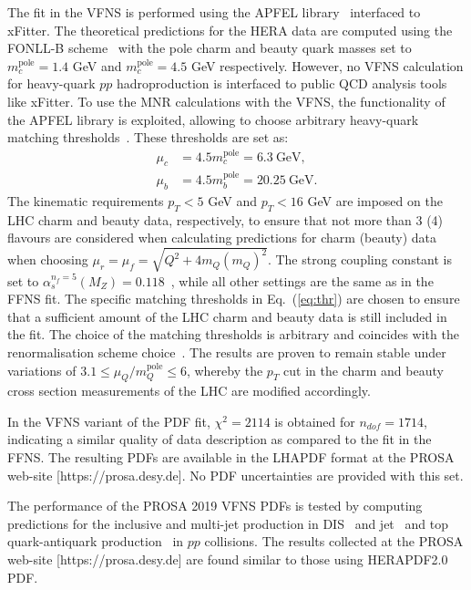 \documentclass[12pt]{article}
\begin{document}
The fit in the VFNS is performed using the APFEL library~\cite{Bertone:2013vaa} interfaced to xFitter.
The theoretical predictions for the HERA data are computed using the FONLL-B scheme~\cite{Forte:2010ta} with the pole charm and beauty quark masses set to $m_c^{\textrm{pole}} = 1.4$ GeV and $m_c^{\textrm{pole}} = 4.5$ GeV respectively.
However, no VFNS calculation for heavy-quark $pp$ hadroproduction is interfaced to public QCD analysis tools like xFitter.
To use the MNR calculations with the VFNS, the functionality of the APFEL library is exploited, allowing to choose arbitrary heavy-quark matching thresholds~\cite{Bertone:2017ehk}. These thresholds are set as:
\begin{equation}
\begin{aligned}
\mu_c &= 4.5m_c^{\textrm{pole}} = 6.3~\textrm{GeV},\\
\mu_b &= 4.5m_b^{\textrm{pole}} =  20.25~\textrm{GeV}.
\label{eq:thr}
\end{aligned}
\end{equation}
The kinematic requirements $p_T < 5$ GeV and $p_T < 16$ GeV are imposed on the LHC charm and beauty data, respectively, to ensure that not more than 3 (4) flavours are considered when calculating predictions for charm (beauty) data when choosing $\mu_r = \mu_f = \sqrt{Q^2 + 4m_Q(m_Q)^2}$.
The strong coupling constant is set to $\alpha_s^{n_f = 5}(M_Z) = 0.118$~\cite{Tanabashi:2018oca}, while all other settings are the same as in the FFNS fit.
The specific matching thresholds in Eq.~(\ref{eq:thr}) are chosen to ensure that a sufficient amount of the LHC charm and beauty data is still included in the fit.
The choice of the matching thresholds is arbitrary and coincides with the renormalisation scheme choice~\cite{Bertone:2017ehk}. 
The results are proven to remain stable under variations of $3.1 \le \mu_Q/m_Q^{\textrm{pole}} \le 6$, whereby the $p_T$  cut in the charm and beauty cross section measurements of the LHC are modified accordingly. 

In the VFNS variant of the PDF fit, $\chi^2 = 2114$ is obtained for $n_{dof} = 1714$, indicating a similar quality of data description as compared to the fit in the FFNS. The resulting PDFs are available in the LHAPDF format at the PROSA web-site [https://prosa.desy.de]. No PDF uncertainties are provided with this set.

The performance of the PROSA 2019 VFNS PDFs is tested by computing predictions for the inclusive and multi-jet production in DIS~\cite{Chekanov:2002be,Chekanov:2006xr,Abramowicz:2010cka,Aktas:2007aa,Aaron:2010ac} 
and jet~\cite{Chatrchyan:2012bja} and top quark-antiquark production~\cite{Sirunyan:2017azo,Sirunyan:2019zvx} in $pp$ collisions. The results collected at the PROSA web-site [https://prosa.desy.de] are found similar to those using HERAPDF2.0 PDF.
\end{document}
